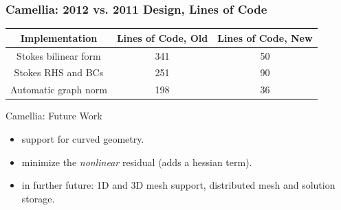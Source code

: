 \documentclass[mathserif]{beamer}
\begin{document}
\begin{frame}
\frametitle{Camellia: 2012 vs. 2011 Design, Lines of Code}

\begin{table}[h!b!p!]
\begin{center}
\begin{tabular}{| c | c | c |}
\hline
Implementation & Lines of Code, Old & Lines of Code, New\\
\hline
Stokes bilinear form & 341 & 50 \\
Stokes RHS and BCs & 251 & 90\\
Automatic graph norm & 198 & 36 \\
\hline
\end{tabular}
\end{center}
\end{table}

\begin{block}{Camellia: Future Work}
\begin{itemize}
\item support for curved geometry.
\item minimize the \emph{nonlinear} residual (adds a hessian term).
\item in further future: 1D and 3D mesh support, distributed mesh and solution storage.
\end{itemize}
\end{block}
\end{frame}

\begin{frame}
\frametitle{}
\begin{block}{}
 \\
\\
\end{block}
\vspace{1cm}
\\
\end{frame}


{\scriptsize

}
 
\end{document}
